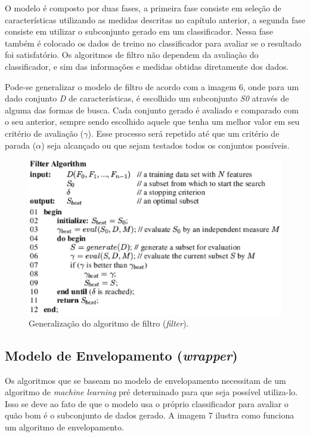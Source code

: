 O modelo é composto por duas fases, a primeira fase consiste em seleção de características utilizando as medidas descritas no capítulo anterior, a segunda fase consiste em utilizar o subconjunto gerado em um classificador. Nessa fase também é colocado os dados de treino no classificador para avaliar se o resultado foi satisfatório. Os algoritmos de filtro não dependem da avaliação do classificador, e sim das informações e medidas obtidas diretamente dos dados. \cite{huan_1998}

Pode-se generalizar o modelo de filtro de acordo com a imagem 6, onde para um dado conjunto \textit{D} de características, é escolhido um subconjunto \textit{S0} através de alguma das formas de busca. Cada conjunto gerado é avaliado e comparado com o seu anterior, sempre sendo escolhido aquele que tenha um melhor valor em seu critério de avaliação ($\gamma$). Esse processo será repetido até que um critério de parada ($\alpha$) seja alcançado ou que sejam testados todos os conjuntos possíveis. \cite{liu_2005}

\begin{figure}[h]
	\centering
	\label{fig05}
		\includegraphics[keepaspectratio=true,scale=0.7]{figuras/fig07.eps}
	\caption{Generalização do algoritmo de filtro (\textit{filter}). \cite{liu_2005}}
\end{figure}

\subsection{Modelo de Envelopamento (\textit{wrapper})}

Os algoritmos que se baseam no modelo de envelopamento necessitam de um algoritmo de \textit{machine learning} pré determinado para que seja possível utiliza-lo. Isso se deve ao fato de que o modelo usa o próprio classificador para avaliar o quão bom é o subconjunto de dados gerado. A imagem 7 ilustra como funciona um algoritmo de envelopamento.

